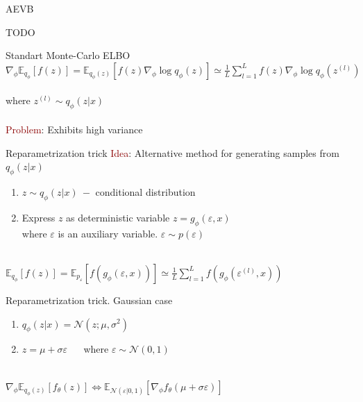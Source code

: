 \documentclass[unicode,11pt]{beamer}
\begin{document}
\begin{frame}[fragile]{AEVB}


  TODO

\end{frame}

\begin{frame}[fragile]{Standart Monte-Carlo ELBO}
  $\nabla_{\phi} \mathbb{E}_{q_{\phi}} [f(z)] = \mathbb{E}_{q_{\phi}(z)} \left[ f(z) \nabla_{\phi}
  \log q_{\phi}(z) \right] \simeq \frac{1}{L} \sum\limits_{l=1}^L f(z) \nabla_{\phi} \log q_{\phi}(z^{(l)})$\\
  ~\\
  where $z^{(l)} \sim q_{\phi}(z|x)$\\
  ~\\
  \textcolor{darkred}{Problem}: Exhibits high variance
\end{frame}

\begin{frame}[fragile]{Reparametrization trick}
  \textcolor{darkred}{Idea}: Alternative method for generating samples from $q_{\phi}(z|x)$
  ~\\
  \begin{enumerate}
    \item $z \sim q_{\phi}(z|x)~-$ conditional distribution
    \item Express $z$ as deterministic variable $z = g_{\phi}(\varepsilon, x)$\\
      where $\varepsilon$ is an auxiliary variable. $\varepsilon \sim p(\varepsilon)$
  \end{enumerate}
~\\
  $\mathbb{E}_{q_{\phi}}[f(z)] = \mathbb{E}_{p_{\varepsilon}} \left[ f(g_{\phi}(\varepsilon, x)) \right] \simeq
  \frac{1}{L} \sum\limits_{l=1}^L f(g_{\phi}(\varepsilon^{(l)}, x))$
\end{frame}

\begin{frame}[fragile]{Reparametrization trick. Gaussian case}
  \begin{enumerate}
    \item $q_\phi(z|x) = \mathcal{N}(z; \mu, \sigma^2)$
    \item $z = \mu + \sigma\varepsilon$ ~~ where $\varepsilon \sim \mathcal{N}(0, 1)$
  \end{enumerate}
  ~\\
  $\nabla_{\phi} \mathbb{E}_{q_{\phi}(z)} [f_{\theta}(z)] \Leftrightarrow
  \mathbb{E}_{\mathcal{N}(\varepsilon| 0, 1)} [\nabla_{\phi} f_{\theta} (\mu + \sigma \varepsilon)]$
\end{frame}
\end{document}
